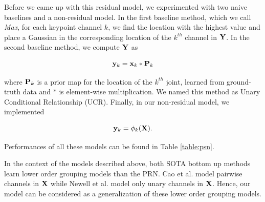 \documentclass[runningheads]{llncs}
\begin{document}
Before we came up with this residual model, we experimented with two naive baselines and a non-residual model. In the first baseline method, which we call \textit{Max}, for each keypoint channel $k$, we find the location with the highest value and place  a Gaussian in the corresponding location of the $k^{th}$ channel in $\bf Y$.  In the second baseline method, we compute $\bf Y$ as 


\begin{equation}
{\bf y}_k = {\bf x}_k * {\bf P}_k
\end{equation}


\noindent where ${\bf P}_k$ is a prior map for the location of the $k^{th}$ joint, learned from ground-truth data and $*$ is element-wise multiplication. We named this method as Unary Conditional Relationship (UCR). Finally, in our non-residual model, we implemented 


\begin{equation}
{\bf y}_k = \phi_k ( {\bf X}). 
\end{equation}


\noindent Performances of all these models can be found in Table   \ref{table:psn}. 


In the context of the models described above, both SOTA bottom up methods learn lower order grouping models than the PRN. Cao et al. \cite{Cao2016} model pairwise channels in ${\bf X}$ while Newell et al. \cite{Newell2016b} model only unary channels in ${\bf X}$. Hence, our model can be considered as a generalization of these lower order grouping models. 






\end{document}
